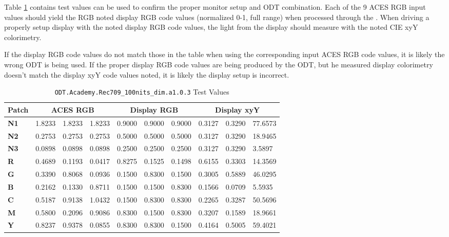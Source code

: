 Table \ref{tab:testValues-rec709} contains test values can be used to confirm the proper monitor setup and ODT combination.  Each of the 9 ACES RGB input values should yield the RGB noted display RGB code values (normalized 0-1, full range) when processed through the \texttt{}. When driving a properly setup display with the noted display RGB code values, the light from the display should measure with the noted CIE xyY colorimetry.  

If the display RGB code values do not match those in the table when using the corresponding input ACES RGB code values, it is likely the wrong ODT is being used.  If the proper display RGB code values are being produced by the ODT, but he measured display colorimetry doesn't match the display xyY code values noted, it is likely the display setup is incorrect.

\begin{table}[ht!]
    \centering
    \begin{tabular}{|l|l|l|l|l|l|l|l|l|l|}
        \hline
        \multicolumn{1}{|c|}{\textbf{Patch}} & \multicolumn{3}{c|}{\textbf{ACES RGB}} & \multicolumn{3}{c|}{\textbf{Display RGB}} & \multicolumn{3}{c|}{\textbf{Display xyY}} \\ \hline
        \textbf{N1} & 1.8233 & 1.8233 & 1.8233 & 0.9000 & 0.9000 & 0.9000 & 0.3127 & 0.3290 & 77.6573 \\ \hline
        \textbf{N2} & 0.2753 & 0.2753 & 0.2753 & 0.5000 & 0.5000 & 0.5000 & 0.3127 & 0.3290 & 18.9465 \\ \hline
        \textbf{N3} & 0.0898 & 0.0898 & 0.0898 & 0.2500 & 0.2500 & 0.2500 & 0.3127 & 0.3290 & 3.5897  \\ \hline
        \textbf{R}  & 0.4689 & 0.1193 & 0.0417 & 0.8275 & 0.1525 & 0.1498 & 0.6155 & 0.3303 & 14.3569 \\ \hline
        \textbf{G}  & 0.3390 & 0.8068 & 0.0936 & 0.1500 & 0.8300 & 0.1500 & 0.3005 & 0.5889 & 46.0295 \\ \hline
        \textbf{B}  & 0.2162 & 0.1330 & 0.8711 & 0.1500 & 0.1500 & 0.8300 & 0.1566 & 0.0709 & 5.5935  \\ \hline
        \textbf{C}  & 0.5187 & 0.9138 & 1.0432 & 0.1500 & 0.8300 & 0.8300 & 0.2265 & 0.3287 & 50.5696 \\ \hline
        \textbf{M}  & 0.5800 & 0.2096 & 0.9086 & 0.8300 & 0.1500 & 0.8300 & 0.3207 & 0.1589 & 18.9661 \\ \hline
        \textbf{Y}  & 0.8237 & 0.9378 & 0.0855 & 0.8300 & 0.8300 & 0.1500 & 0.4164 & 0.5005 & 59.4021 \\ \hline
    \end{tabular}
    \caption[SDR Broadcast Television Mastering - Test Values]{ \texttt{ODT.Academy.Rec709\_100nits\_dim.a1.0.3} Test Values}
    \label{tab:testValues-rec709}
\end{table}

